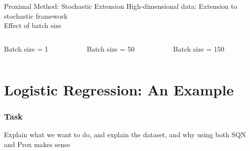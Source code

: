 \documentclass[10pt]{beamer}
\begin{document}
   \begin{frame}{Proximal Method: Stochastic Extension}
   High-dimensional data:
   Extension to stochastic framework\\
   \vspace{10pt}
   \alert{Effect of batch size}
   	\begin{columns}[T]
   		\hspace{-16pt}
   		\begin{column}{.3\textwidth}
   			\hspace{30pt} \scriptsize Batch size = 1
   			\vspace{10pt}
   			\resizebox{1.18\linewidth}{!}{}
   		\end{column}\hspace{-16pt}
   		\begin{column}{.3\textwidth}
   			\hspace{30pt} \scriptsize Batch size = 50
   			\vspace{10pt}
   			\resizebox{1.18\linewidth}{!}{}
   		\end{column}\hspace{-16pt}
   		\begin{column}{.3\textwidth}
   			\hspace{30pt} \scriptsize Batch size = 150
   			\vspace{10pt}
   			\resizebox{1.18\linewidth}{!}{}
   		\end{column}
   	\end{columns}
   \end{frame}

\section{Logistic Regression: An Example}
  \begin{frame}\frametitle{Task}
    Explain what we want to do, and explain the dataset,
    and why using both SQN and Prox makes sense   
  \end{frame}
  
\end{document}
